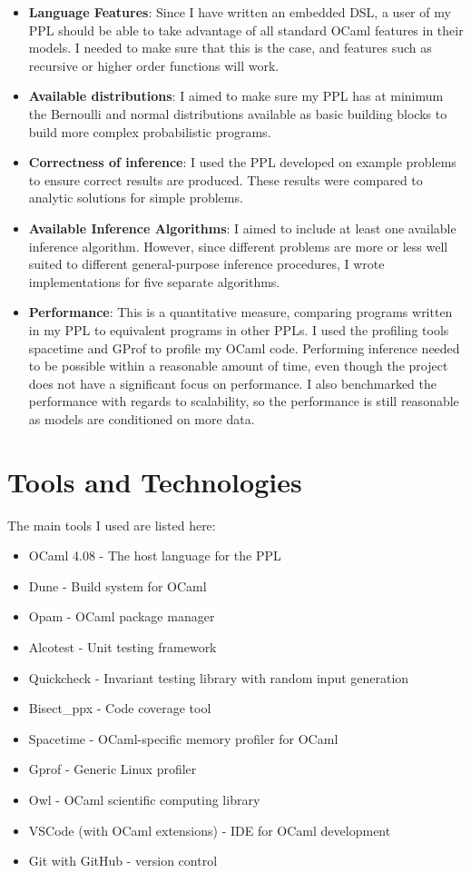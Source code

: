 \begin{itemize}
	\item \textbf{Language Features}: Since I have written an embedded DSL, a user of my PPL should be able to take advantage of all standard OCaml features in their models. I needed to make sure that this is the case, and features such as recursive or higher order functions will work.
	\item \textbf{Available distributions}: I aimed to make sure my PPL has at minimum the Bernoulli and normal distributions available as basic building blocks to build more complex probabilistic programs.
	\item \textbf{Correctness of inference}: I used the PPL developed on example problems to ensure correct results are produced. These results were compared to analytic solutions for simple problems.
	\item \textbf{Available Inference Algorithms}: I aimed to include at least one available inference algorithm. However, since different problems are more or less well suited to different general-purpose inference procedures, I wrote implementations for five separate algorithms.
	\item \textbf{Performance}: This is a quantitative measure, comparing programs written in my PPL to equivalent programs in other PPLs. I used the profiling tools spacetime and GProf to profile my OCaml code. Performing inference needed to be possible within a reasonable amount of time, even though the project does not have a significant focus on performance. I also benchmarked the performance with regards to scalability, so the performance is still reasonable as models are conditioned on more data.
\end{itemize}

\section{Tools and Technologies}
The main tools I used are listed here:
\begin{itemize}[itemsep=-1ex]
	\item OCaml 4.08 - The host language for the PPL 
	\item Dune - Build system for OCaml
	\item Opam - OCaml package manager
	\item Alcotest - Unit testing framework
	\item Quickcheck - Invariant testing library with random input generation
	\item Bisect\_ppx - Code coverage tool
	\item Spacetime - OCaml-specific memory profiler for OCaml
	\item Gprof - Generic Linux profiler
	\item Owl -  OCaml scientific computing library
	\item VSCode (with OCaml extensions) - IDE for OCaml development
	\item Git with GitHub - version control
\end{itemize}

